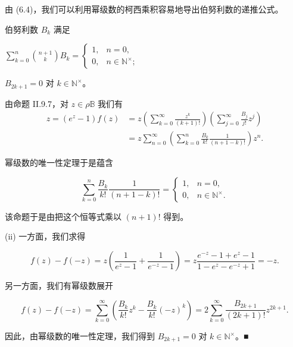 由 (6.4)，我们可以利用幂级数的柯西乘积容易地导出伯努利数的递推公式。

\begin{proposition}

伯努利数 $ B_k $ 满足

\begin{subitems}
\item

$ \sum_{k=0}^{n}\binom{n+1}{k}B_k = \begin{cases} 1 , & n = 0 , \\ 0 , & n \in \mathbb{N}^\times ; \end{cases} $

\item

$ B_{2k+1} = 0 $ 对 $ k \in \mathbb{N}^\times $。

\proofhead
由命题 II.9.7，对 $ z \in \rho\mathbb{B} $ 我们有
\begin{equation*}
\begin{aligned}
z = (e^z - 1)f(z) &= z\left( \sum_{k=0}^{\infty} \frac{z^k}{(k+1)!} \right)\left( \sum_{j=0}^{\infty} \frac{B_j}{j!}z^j \right) \\ &= z\sum_{n=0}^{\infty}\left( \sum_{k=0}^{n} \frac{B_k}{k!}\frac{1}{(n+1-k)!} \right)z^n .
\end{aligned}
\end{equation*}

幂级数的唯一性定理于是蕴含

\begin{equation*}
\sum_{k=0}^{n}\frac{B_k}{k!}\frac{1}{(n+1-k)!} = \begin{cases} 1 , & n = 0 , \\ 0 , & n \in \mathbb{N}^\times . \end{cases}
\end{equation*}

该命题于是由把这个恒等式乘以 $ (n+1)! $ 得到。

\end{subitems}

(ii) 一方面，我们求得

\[
f(z) - f(-z) = z\left( \frac{1}{e^z - 1} + \frac{1}{e^{-z} - 1} \right) = z\frac{e^{-z} - 1 + e^z - 1}{1 - e^z - e^{-z} + 1} = -z .
\]

另一方面，我们有幂级数展开

\[
f(z) - f(-z) = \sum_{k=0}^{\infty}\left( \frac{B_k}{k!}z^k - \frac{B_k}{k!}(-z)^k \right) = 2\sum_{k=0}^{\infty}\frac{B_{2k+1}}{(2k+1)!}z^{2k+1} .
\]

因此，由幂级数的唯一性定理，我们得到 $ B_{2k+1} = 0 $ 对 $ k \in \mathbb{N}^\times $。\nobreak\hspace{0.35em}■

\end{proposition}

